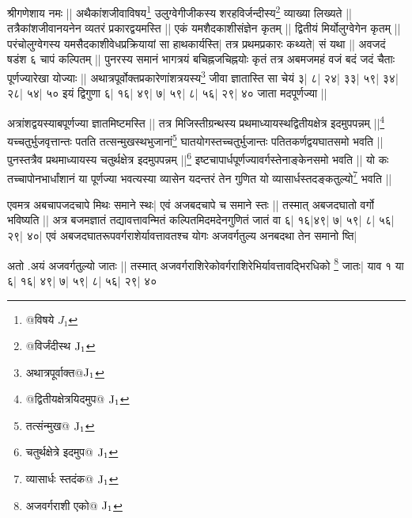 \documentclass[12pt]{article}
\begin{document}
{\s  
श्रीगणेशाय नमः || 
अथैकांशजीवाविषय\footnote{{\s @विषये } $J_1$}
उलुग्वेगीजीकस्य
शरहविर्जन्दीस्य\footnote{{\s @विर्जंदीस्थ }${\rm J_1}$}
व्याख्या लिख्यते ||
तत्रैकांशजी\-वान\-यनेन व्यतरं प्रकारद्वयमस्ति || 
एकं यमशैदकाशीसंज्ञेन कृतम् ||
द्वितीयं मिर्योलुग्वेगेन कृतम् ||
परंचोलुग्वेगस्य यमसैदकाशीवेधप्रक्रियायां
सा हाथकार्यस्ति|
तत्र प्रथमप्रकारः कथ्यते| सं यथा ||
अवजदं षडंश ६ चापं कल्पितम् ||
पुनरस्य समानं भागत्रयं बचिह्नजचिह्नयोः कृतं
तत्र अबमजमहं वजं बदं जदं चैताः पूर्णज्यारेखा
योज्याः ||
अथात्रपूर्वोक्तप्रकारेणांशत्रयस्य\footnote{{\s अथात्रपूर्वाक्त@}${\rm J_1}$}
जीवा ज्ञातास्ति सा चेयं ३| ८| २४| ३३| ५९| ३४| २८| ५४| ५०
इयं द्विगुणा ६| १६| ४९| ७| ५९| ८| ५६| २९| ४० जाता मदपूर्णज्या ||

अत्रांशद्वयस्याबपूर्णज्या ज्ञातमिष्टमस्ति ||
तत्र मिजिस्तीग्रन्थस्य
प्रथमाध्यायस्थद्वितीयक्षेत्र
इदमुपपन्नम् ||\footnote{{\s @द्वितीयक्षेत्रयिदमुप@ }${\rm J_1}$}
यच्चतुर्भुजवृत्तान्तः पतति
तत्सन्मुखस्थभुजानां\footnote{{\s तत्संन्मुख@ } ${\rm J_1}$}
घातयोगस्तच्चतुर्भुजान्तः पतितकर्णद्वयघातसमो भवति ||
पुनस्तत्रैव प्रथमाध्यायस्य
चतुर्थक्षेत्र इदमुपपन्नम् ||\footnote{{\s चतुर्थक्षेत्रे इदमुप@ }${\rm J_1}$}
इष्टचापार्धपूर्णज्यावर्गस्तेनाङ्केनसमो भवति ||
यो कः %
 तच्चापोनभार्धांशानं या पूर्णज्या भवत्यस्या
व्यासेन यदन्तरं तेन गुणित यो
व्यासार्धस्तदङ्कतुल्यो\footnote{{\s व्यासार्धः स्तदंक@ }${\rm J_1}$}
भवति ||

एवमत्र अबचापजदचापे मिथः समाने स्थः|
एवं अजबदचापे च समाने स्तः ||
तस्मात् अबजदघातो वर्गो भविष्यति ||
अत्र बजमज्ञातं तद्यावत्तावन्मितं कल्पितमिदमदेनगुणितं
जातं वा ६| १६|४९| ७| ५९| ८| ५६| २९| ४०|
एवं अबजदघातरूपवर्गराशेर्यावत्तावतश्च योगः
अजवर्गतुल्य अनबदथा तेन समानो ष्ति|

अतो .अयं अजवर्गतुल्यो जातः ||
तस्मात्
अजवर्गराशिरेकोवर्गराशिरेभिर्यावत्तावद्भिरधिको
\footnote{{\s अजवर्गराशी एको@ }${\rm J_1}$}
जातः|
याव १ या ६| १६| ४९| ७| ५९| ८| ५६| २९| ४०

}
\end{document}
